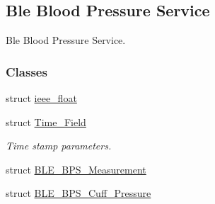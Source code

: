 \hypertarget{group___b_l_e___b_p_s}{}\subsection{Ble Blood Pressure Service}
\label{group___b_l_e___b_p_s}


Ble Blood Pressure Service.  


\subsubsection*{Classes}
\begin{DoxyCompactItemize}
\item 
struct \hyperlink{structieee__float}{ieee\+\_\+float}
\item 
struct \hyperlink{struct_time___field}{Time\+\_\+\+Field}
\begin{DoxyCompactList}\small\item\em Time stamp parameters. \end{DoxyCompactList}\item 
struct \hyperlink{struct_b_l_e___b_p_s___measurement}{B\+L\+E\+\_\+\+B\+P\+S\+\_\+\+Measurement}
\item 
struct \hyperlink{struct_b_l_e___b_p_s___cuff___pressure}{B\+L\+E\+\_\+\+B\+P\+S\+\_\+\+Cuff\+\_\+\+Pressure}
\end{DoxyCompactItemize}
